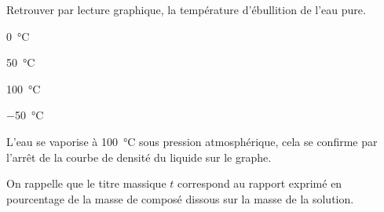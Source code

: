 \begin{enonce}
Retrouver par lecture graphique, la température d'ébullition de l'eau pure.
\begin{listeQCM4Colonnes}
	\item \SI{0}{\celsius}
	\item \SI{50}{\celsius}
	\item \SI{100}{\celsius}
	\item \SI{-50}{\celsius}
	\end{listeQCM4Colonnes}		
\medskip
\end{enonce}

\reponse{\reponseC{}}

\begin{corrige}
L'eau se vaporise à \SI{100}{\celsius} sous pression atmosphérique, cela se confirme par l'arrêt de la courbe de densité du liquide sur le graphe.
\end{corrige}



\finEntrainement




\newpage



\bigskip

\begin{prerequis}
On rappelle que le titre massique $t$ correspond au rapport exprimé en pourcentage de la masse de composé dissous sur la masse de la solution. 
\end{prerequis}



\hauteurLargeurCadreReponse		{7mm}{4cm}
\initialisationEntrainement

